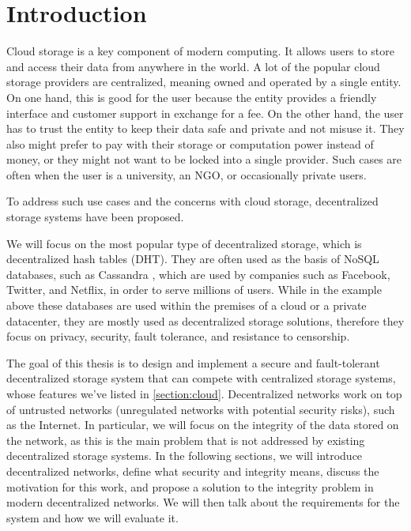 \chapter{Introduction}
\label{chapter:introduction}

Cloud storage is a key component of modern computing.
It allows users to store and access their data from anywhere in the world.
A lot of the popular cloud storage providers are centralized, meaning owned and operated by a single entity.
On one hand, this is good for the user because the entity provides a friendly interface and customer support
in exchange for a fee.
On the other hand, the user has to trust the entity to keep their data safe and private and not misuse it.
They also might prefer to pay with their storage or computation power instead of money, or 
they might not want to be locked into a single provider.
Such cases are often when the user is a university, an NGO, or occasionally private users.

To address such use cases and the concerns with cloud storage, decentralized storage systems have been proposed.

We will focus on the most popular type of decentralized storage, which is decentralized hash tables (DHT).
They are often used as the basis of NoSQL databases, such as Cassandra \cite{cassandra},
which are used by companies such as Facebook, Twitter, and Netflix, in order to serve millions of users.
While in the example above these databases are used within the premises of a cloud or a private datacenter,
they are mostly used as decentralized storage solutions,
therefore they focus on privacy, security, fault tolerance, and resistance to censorship.

The goal of this thesis is to design and implement a secure and fault-tolerant decentralized storage system
that can compete with centralized storage systems, whose features we've listed in \ref{section:cloud}.
Decentralized networks work on top of untrusted networks (unregulated networks with potential security risks),
such as the Internet.
In particular, we will focus on the integrity of the data stored on the network,
as this is the main problem that is not addressed by existing decentralized storage systems.
In the following sections, we will introduce decentralized networks,
define what security and integrity means, discuss the motivation for this work,
and propose a solution to the integrity problem in modern decentralized networks.
We will then talk about the requirements for the system and how we will evaluate it.

